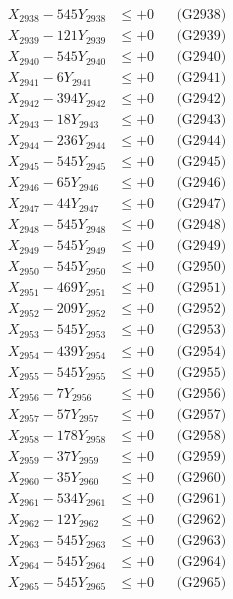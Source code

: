 \documentclass[a4paper,10pt]{article}
\begin{document}
{\begin{align}
X_{2938} - 545Y_{2938} &\leq +0 && \text{(G2938)} \\
X_{2939} - 121Y_{2939} &\leq +0 && \text{(G2939)} \\
X_{2940} - 545Y_{2940} &\leq +0 && \text{(G2940)} \\
\allowbreak
X_{2941} - 6Y_{2941} &\leq +0 && \text{(G2941)} \\
X_{2942} - 394Y_{2942} &\leq +0 && \text{(G2942)} \\
X_{2943} - 18Y_{2943} &\leq +0 && \text{(G2943)} \\
X_{2944} - 236Y_{2944} &\leq +0 && \text{(G2944)} \\
X_{2945} - 545Y_{2945} &\leq +0 && \text{(G2945)} \\
X_{2946} - 65Y_{2946} &\leq +0 && \text{(G2946)} \\
X_{2947} - 44Y_{2947} &\leq +0 && \text{(G2947)} \\
X_{2948} - 545Y_{2948} &\leq +0 && \text{(G2948)} \\
X_{2949} - 545Y_{2949} &\leq +0 && \text{(G2949)} \\
X_{2950} - 545Y_{2950} &\leq +0 && \text{(G2950)} \\
\allowbreak
X_{2951} - 469Y_{2951} &\leq +0 && \text{(G2951)} \\
X_{2952} - 209Y_{2952} &\leq +0 && \text{(G2952)} \\
X_{2953} - 545Y_{2953} &\leq +0 && \text{(G2953)} \\
X_{2954} - 439Y_{2954} &\leq +0 && \text{(G2954)} \\
X_{2955} - 545Y_{2955} &\leq +0 && \text{(G2955)} \\
X_{2956} - 7Y_{2956} &\leq +0 && \text{(G2956)} \\
X_{2957} - 57Y_{2957} &\leq +0 && \text{(G2957)} \\
X_{2958} - 178Y_{2958} &\leq +0 && \text{(G2958)} \\
X_{2959} - 37Y_{2959} &\leq +0 && \text{(G2959)} \\
X_{2960} - 35Y_{2960} &\leq +0 && \text{(G2960)} \\
\allowbreak
X_{2961} - 534Y_{2961} &\leq +0 && \text{(G2961)} \\
X_{2962} - 12Y_{2962} &\leq +0 && \text{(G2962)} \\
X_{2963} - 545Y_{2963} &\leq +0 && \text{(G2963)} \\
X_{2964} - 545Y_{2964} &\leq +0 && \text{(G2964)} \\
X_{2965} - 545Y_{2965} &\leq +0 && \text{(G2965)} \\

\end{align}}
\end{document}
